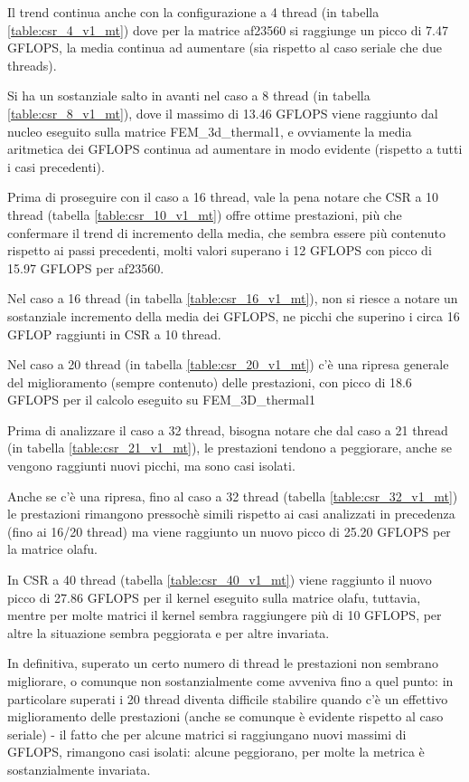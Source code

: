 \documentclass[a4paper,9pt]{extarticle}
\begin{document}
Il trend continua anche con la
configurazione a 4 thread (in tabella \ref{table:csr_4_v1_mt}) dove per la matrice af23560 si
raggiunge un picco di 7.47 GFLOPS, la media continua ad aumentare (sia rispetto al caso seriale
che due threads).

Si ha un sostanziale salto in avanti nel caso a 8 thread (in tabella \ref{table:csr_8_v1_mt}), dove il massimo di 13.46 GFLOPS viene 
raggiunto dal nucleo eseguito sulla matrice FEM\_3d\_thermal1, e ovviamente la media aritmetica 
dei GFLOPS continua ad aumentare in modo evidente (rispetto a tutti i casi precedenti).

Prima di proseguire con il caso a 16 thread, vale la pena notare che CSR a 10 thread (tabella \ref{table:csr_10_v1_mt}) offre
ottime prestazioni, più che confermare il trend di incremento della media, che sembra essere più
contenuto rispetto ai passi precedenti, molti valori superano i 12 GFLOPS con picco di 15.97 
GFLOPS per af23560.

Nel caso a 16 thread (in tabella \ref{table:csr_16_v1_mt}), 
non si riesce a notare un sostanziale incremento della media dei GFLOPS,
ne picchi che superino i circa 16 GFLOP raggiunti in CSR a 10 thread.

Nel caso a 20 thread (in tabella \ref{table:csr_20_v1_mt}) c'è una ripresa generale del
miglioramento (sempre contenuto) delle prestazioni, con picco di 18.6 GFLOPS per il 
calcolo eseguito su FEM\_3D\_thermal1

Prima di analizzare il caso a 32 thread, bisogna notare che dal caso a 21 thread (in tabella \ref{table:csr_21_v1_mt}), le prestazioni tendono a peggiorare, anche se vengono raggiunti nuovi
picchi, ma sono casi isolati. 

Anche se c'è una ripresa, fino al caso a 32
thread (tabella \ref{table:csr_32_v1_mt}) le prestazioni rimangono pressochè simili rispetto
ai casi analizzati in precedenza (fino ai 16/20 thread) ma viene raggiunto un nuovo picco di 
25.20 GFLOPS per la matrice olafu.

In CSR a 40 thread (tabella \ref{table:csr_40_v1_mt}) viene raggiunto 
il nuovo picco di 27.86 GFLOPS per 
il kernel eseguito sulla matrice olafu, tuttavia, mentre per molte matrici il 
kernel sembra raggiungere più di 10 GFLOPS, per altre la situazione sembra peggiorata e per altre
invariata.

In definitiva, superato un certo numero di thread le prestazioni non sembrano migliorare, o
comunque non sostanzialmente come avveniva fino a quel punto: in particolare superati i 20 thread
diventa difficile stabilire quando c'è un effettivo miglioramento delle prestazioni (anche se 
comunque è evidente rispetto al caso seriale) - il fatto
che per alcune matrici si raggiungano nuovi massimi di GFLOPS, rimangono casi isolati: alcune
peggiorano, per molte la metrica è sostanzialmente invariata.
\end{document}
